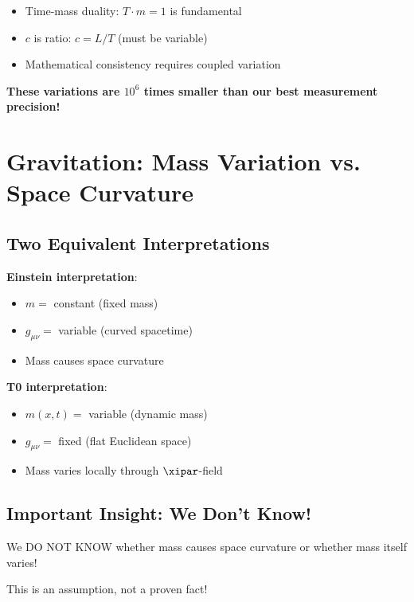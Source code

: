 	\begin{itemize}
		\item Time-mass duality: $T \cdot m = 1$ is fundamental
		\item $c$ is ratio: $c = L/T$ (must be variable)
		\item Mathematical consistency requires coupled variation
	\end{itemize}
	
	\textbf{These variations are $10^6$ times smaller than our best measurement precision!}
	
	\section{Gravitation: Mass Variation vs. Space Curvature}
	
	\subsection{Two Equivalent Interpretations}
	
	\textbf{Einstein interpretation}:
	\begin{itemize}
		\item $m = $ constant (fixed mass)
		\item $g_{\mu\nu} = $ variable (curved spacetime)
		\item Mass causes space curvature
	\end{itemize}
	
	\textbf{T0 interpretation}:
	\begin{itemize}
		\item $m(x,t) = $ variable (dynamic mass)
		\item $g_{\mu\nu} = $ fixed (flat Euclidean space)
		\item Mass varies locally through $\xipar$-field
	\end{itemize}
	
	\subsection{Important Insight: We Don't Know!}
	
	\begin{tcolorbox}[colback=red!5!white,colframe=red!75!black,title=Attention - Fundamental Point]
		We DO NOT KNOW whether mass causes space curvature or whether mass itself varies!
		
		This is an assumption, not a proven fact!
	\end{tcolorbox}
	
